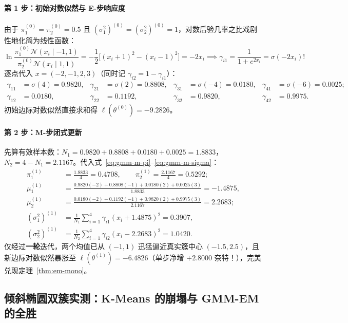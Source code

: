 \paragraph{第 1 步：初始对数似然与 E-步响应度}
由于 $\pi_1^{(0)} = \pi_2^{(0)} = 0.5$ 且 $(\sigma_1^2)^{(0)} = (\sigma_2^2)^{(0)} = 1$，对数后验几率之比戏剧性地化简为线性函数：
\[
  \ln\frac{\pi_1^{(0)}\mathcal{N}(x_i\mid -1, 1)}{\pi_2^{(0)}\mathcal{N}(x_i\mid 1, 1)}
  = -\frac{1}{2}\big[(x_i + 1)^2 - (x_i - 1)^2\big] = -2 x_i \implies \gamma_{i1} = \frac{1}{1 + e^{2x_i}} = \sigma(-2 x_i)!
\]
逐点代入 $x = (-2, -1, 2, 3)$（同时记 $\gamma_{i2} = 1 - \gamma_{i1}$）：
\begin{align*}
  \gamma_{11} &= \sigma(4) = 0.9820, & \gamma_{21} &= \sigma(2) = 0.8808, & \gamma_{31} &= \sigma(-4) = 0.0180, & \gamma_{41} &= \sigma(-6) = 0.0025; \\
  \gamma_{12} &= 0.0180, & \gamma_{22} &= 0.1192, & \gamma_{32} &= 0.9820, & \gamma_{42} &= 0.9975.
\end{align*}
初始边际对数似然直接求和得 $\ell(\theta^{(0)}) = \mathbf{-9.2826}$。

\paragraph{第 2 步：M-步闭式更新}
先算有效样本数：$N_1 = 0.9820 + 0.8808 + 0.0180 + 0.0025 = 1.8833$，$N_2 = 4 - N_1 = 2.1167$。代入式~\eqref{eq:gmm-m-pi}--\eqref{eq:gmm-m-sigma}：
\begin{align*}
  \pi_1^{(1)} &= \frac{1.8833}{4} = 0.4708, \qquad \pi_2^{(1)} = \frac{2.1167}{4} = 0.5292; \\
  \mu_1^{(1)} &= \frac{0.9820(-2) + 0.8808(-1) + 0.0180(2) + 0.0025(3)}{1.8833} = \mathbf{-1.4875}, \\
  \mu_2^{(1)} &= \frac{0.0180(-2) + 0.1192(-1) + 0.9820(2) + 0.9975(3)}{2.1167} = \mathbf{2.2683}; \\
  (\sigma_1^2)^{(1)} &= \frac{1}{N_1}\sum_{i=1}^4 \gamma_{i1}(x_i + 1.4875)^2 = \mathbf{0.3907}, \\
  (\sigma_2^2)^{(1)} &= \frac{1}{N_2}\sum_{i=1}^4 \gamma_{i2}(x_i - 2.2683)^2 = \mathbf{1.0420}.
\end{align*}
仅经过\textbf{一轮}迭代，两个均值已从 $(-1, 1)$ 迅猛逼近真实簇中心 $(-1.5, 2.5)$，且新边际对数似然暴涨至 $\ell(\theta^{(1)}) = \mathbf{-6.4826}$（单步净增 $+2.8000$ 奈特！），完美兑现定理~\ref{thm:em-mono}。

\subsection{倾斜椭圆双簇实测：K-Means 的崩塌与 GMM-EM 的全胜}


